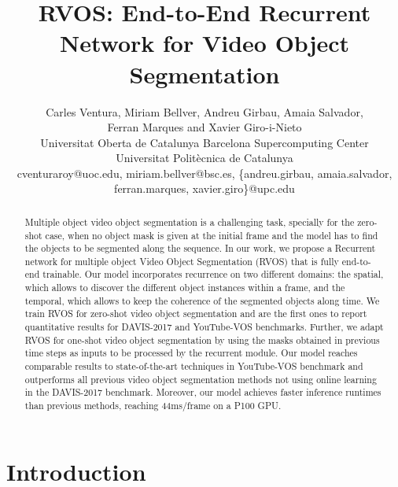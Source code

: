 \documentclass[10pt,twocolumn,letterpaper]{article}
\begin{document}
\title{RVOS: End-to-End Recurrent Network for Video Object Segmentation}

\author{Carles Ventura, Miriam Bellver, Andreu Girbau, Amaia Salvador,
\\ \vspace{-3mm}
Ferran Marques and Xavier Giro-i-Nieto
\\ \vspace{3mm}
Universitat Oberta de Catalunya \:\:\:
Barcelona Supercomputing Center \\
Universitat Polit\`ecnica de Catalunya \\ \vspace{2mm}
\small{cventuraroy@uoc.edu, miriam.bellver@bsc.es, \{andreu.girbau, amaia.salvador, ferran.marques, xavier.giro\}@upc.edu} }





\maketitle


\begin{abstract}


Multiple object video object segmentation is a challenging task, specially for the zero-shot case, when no object mask is given at the initial frame and the model has to find the objects to be segmented along the sequence.
In our work, we propose a Recurrent network for multiple object Video Object Segmentation (RVOS) that is fully end-to-end trainable. Our model incorporates recurrence on two different domains:  the spatial, which allows to discover the different object instances within a frame, and  the temporal, which allows to keep the coherence of the segmented objects along time. We train RVOS for zero-shot video object segmentation and are the first ones to report quantitative results for DAVIS-2017 and YouTube-VOS benchmarks. Further, we adapt RVOS for one-shot video object segmentation by using the masks obtained in previous time steps as inputs to be processed by the recurrent module. Our model reaches comparable results to state-of-the-art techniques in YouTube-VOS benchmark and outperforms all previous video object segmentation methods not using online learning in the DAVIS-2017 benchmark. Moreover, our model achieves faster inference runtimes than previous methods, reaching 44ms/frame on a P100 GPU. \end{abstract} \section{Introduction}
\label{sec:intro}
\end{document}
